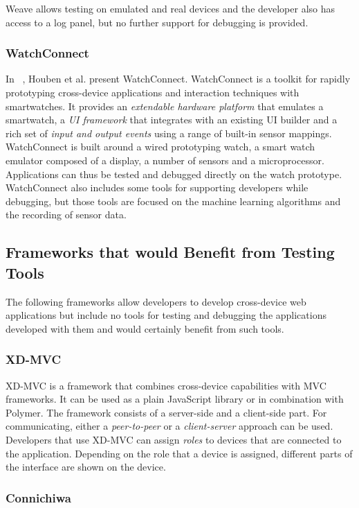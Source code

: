 Weave allows testing on emulated and real devices and the developer also has access to a log panel, but no further support for debugging is provided. 

\subsubsection{WatchConnect}

In ~\cite{watchconnect2015}, Houben et al. present WatchConnect. WatchConnect is a toolkit for rapidly prototyping cross-device applications and interaction techniques with smartwatches. It provides an \emph{extendable hardware platform} that emulates a smartwatch, a \emph{UI framework} that integrates with an existing UI builder and a rich set of \emph{input and output events} using a range of built-in sensor mappings. WatchConnect is built around a wired prototyping watch, a smart watch emulator composed of a display, a number of sensors and a microprocessor. Applications can thus be tested and debugged directly on the watch prototype. WatchConnect also includes some tools for supporting developers while debugging, but those tools are focused on the machine learning algorithms and the recording of sensor data.

\subsection{Frameworks that would Benefit from Testing Tools}

The following frameworks allow developers to develop cross-device web applications but include no tools for testing and debugging the applications developed with them and would certainly benefit from such tools.

\subsubsection{XD-MVC}

XD-MVC is a framework that combines cross-device capabilities with MVC frameworks. It can be used as a plain JavaScript library or in combination with Polymer. The framework consists of a server-side and a client-side part. For communicating, either a \emph{peer-to-peer} or a \emph{client-server} approach can be used. Developers that use XD-MVC can assign \emph{roles} to devices that are connected to the application. Depending on the role that a device is assigned, different parts of the interface are shown on the device. 

\subsubsection{Connichiwa}

